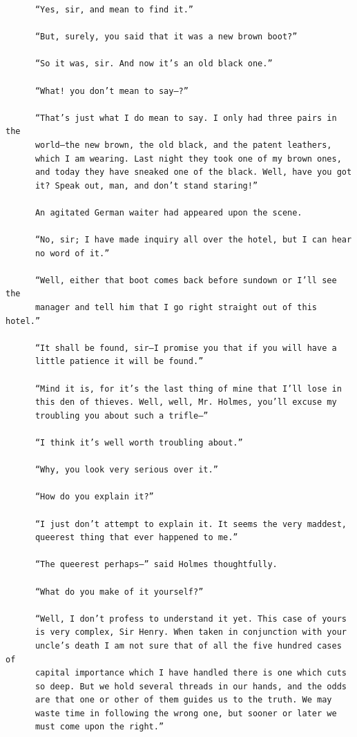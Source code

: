 \documentclass{article}
\begin{document}
\begin{verbatim}
      “Yes, sir, and mean to find it.”

      “But, surely, you said that it was a new brown boot?”

      “So it was, sir. And now it’s an old black one.”

      “What! you don’t mean to say—?”

      “That’s just what I do mean to say. I only had three pairs in the
      world—the new brown, the old black, and the patent leathers,
      which I am wearing. Last night they took one of my brown ones,
      and today they have sneaked one of the black. Well, have you got
      it? Speak out, man, and don’t stand staring!”

      An agitated German waiter had appeared upon the scene.

      “No, sir; I have made inquiry all over the hotel, but I can hear
      no word of it.”

      “Well, either that boot comes back before sundown or I’ll see the
      manager and tell him that I go right straight out of this hotel.”

      “It shall be found, sir—I promise you that if you will have a
      little patience it will be found.”

      “Mind it is, for it’s the last thing of mine that I’ll lose in
      this den of thieves. Well, well, Mr. Holmes, you’ll excuse my
      troubling you about such a trifle—”

      “I think it’s well worth troubling about.”

      “Why, you look very serious over it.”

      “How do you explain it?”

      “I just don’t attempt to explain it. It seems the very maddest,
      queerest thing that ever happened to me.”

      “The queerest perhaps—” said Holmes thoughtfully.

      “What do you make of it yourself?”

      “Well, I don’t profess to understand it yet. This case of yours
      is very complex, Sir Henry. When taken in conjunction with your
      uncle’s death I am not sure that of all the five hundred cases of
      capital importance which I have handled there is one which cuts
      so deep. But we hold several threads in our hands, and the odds
      are that one or other of them guides us to the truth. We may
      waste time in following the wrong one, but sooner or later we
      must come upon the right.”


\end{verbatim}
\end{document}
